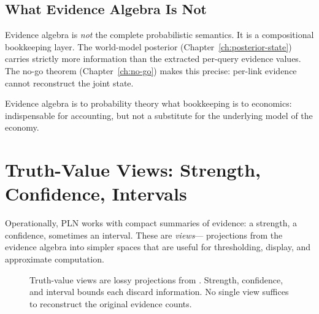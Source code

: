 \documentclass[11pt,openany]{report}
\begin{document}
\section{What Evidence Algebra Is Not}

Evidence algebra is \emph{not} the complete probabilistic semantics.
It is a compositional bookkeeping layer.  The world-model posterior
(Chapter~\ref{ch:posterior-state}) carries strictly more information
than the extracted per-query evidence values.  The no-go theorem
(Chapter~\ref{ch:no-go}) makes this precise: per-link evidence cannot
reconstruct the joint state.

Evidence algebra is to probability theory what bookkeeping is to
economics: indispensable for accounting, but not a substitute for the
underlying model of the economy.


\chapter{Truth-Value Views: Strength, Confidence, Intervals}
\label{ch:tv-views}

Operationally, PLN works with compact summaries of evidence:
a strength, a confidence, sometimes an interval.  These are \emph{views}---
projections from the evidence algebra into simpler spaces that are useful
for thresholding, display, and approximate computation.

\begin{figure}[htbp]
\centering
{}
\caption{Truth-value views are lossy projections from \Evidence{}.
Strength, confidence, and interval bounds each discard information.
No single view suffices to reconstruct the original evidence counts.}
\label{fig:tv-views-projections}
\end{figure}
\end{document}
